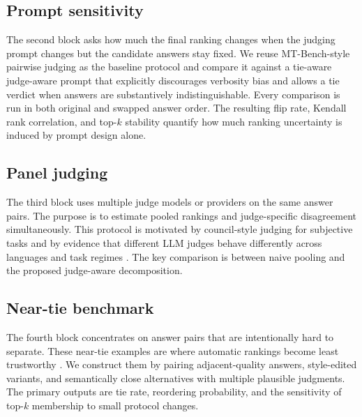 \documentclass{article}
\begin{document}
\begin{bibunit}[unsrtnat]
\subsection{Prompt sensitivity}

The second block asks how much the final ranking changes when the judging prompt changes but the candidate answers stay fixed. We reuse MT-Bench-style pairwise judging as the baseline protocol \citep{zheng2023mtbench} and compare it against a tie-aware judge-aware prompt that explicitly discourages verbosity bias and allows a tie verdict when answers are substantively indistinguishable. Every comparison is run in both original and swapped answer order. The resulting flip rate, Kendall rank correlation, and top-$k$ stability quantify how much ranking uncertainty is induced by prompt design alone.

\subsection{Panel judging}

The third block uses multiple judge models or providers on the same answer pairs. The purpose is to estimate pooled rankings and judge-specific disagreement simultaneously. This protocol is motivated by council-style judging for subjective tasks \citep{zhao2025lmc} and by evidence that different LLM judges behave differently across languages and task regimes \citep{bavaresco2025llmjudges,fu2025multilingualjudge}. The key comparison is between naive pooling and the proposed judge-aware decomposition.

\subsection{Near-tie benchmark}

The fourth block concentrates on answer pairs that are intentionally hard to separate. These near-tie examples are where automatic rankings become least trustworthy \citep{guerdan2025indeterminacy,gao2025reevaluating}. We construct them by pairing adjacent-quality answers, style-edited variants, and semantically close alternatives with multiple plausible judgments. The primary outputs are tie rate, reordering probability, and the sensitivity of top-$k$ membership to small protocol changes.



\end{bibunit}
\end{document}
